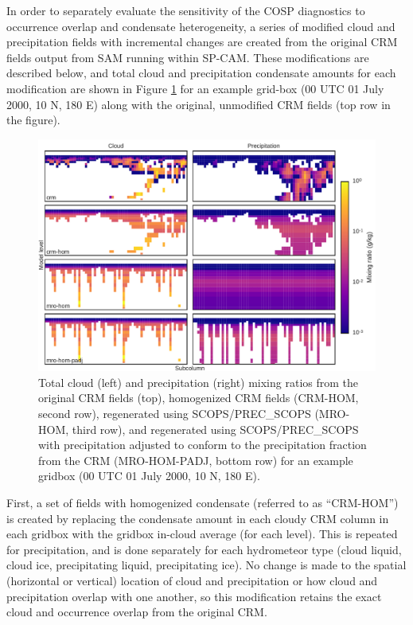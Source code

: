In order to separately evaluate the sensitivity of the COSP diagnostics to occurrence overlap and condensate heterogeneity, a series of modified cloud and precipitation fields with incremental changes are created from the original CRM fields output from SAM running within SP-CAM. These modifications are described below, and total cloud and precipitation condensate amounts for each modification are shown in Figure \ref{subgrid1_mxratio_example} for an example grid-box (00 UTC 01 July 2000, 10 N, 180 E) along with the original, unmodified CRM fields (top row in the figure).

\begin{figure}
    \centering
    \includegraphics[width=\columnwidth]{graphics/subgrid1_mxratio_example.pdf}
    \caption{Total cloud (left) and precipitation (right) mixing ratios from the original CRM fields (top), homogenized CRM fields (CRM-HOM, second row), regenerated using SCOPS/PREC\_SCOPS (MRO-HOM, third row), and regenerated using SCOPS/PREC\_SCOPS with precipitation adjusted to conform to the precipitation fraction from the CRM (MRO-HOM-PADJ, bottom row) for an example gridbox (00 UTC 01 July 2000, 10 N, 180 E).}
    \label{subgrid1_mxratio_example} 
\end{figure}

First, a set of fields with homogenized condensate (referred to as ``CRM-HOM'') is created by replacing the condensate amount in each cloudy CRM column in each gridbox with the gridbox in-cloud average (for each level). This is repeated for precipitation, and is done separately for each hydrometeor type (cloud liquid, cloud ice, precipitating liquid, precipitating ice). No change is made to the spatial (horizontal or vertical) location of cloud and precipitation or how cloud and precipitation overlap with one another, so this modification retains the exact cloud and occurrence overlap from the original CRM.

